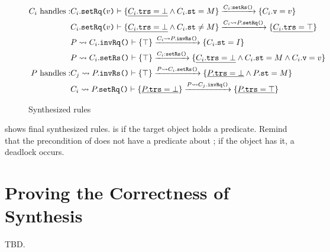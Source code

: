\documentclass[format=manuscript]{acmart}
\begin{document}
\begin{figure}[h]
  \begin{eqnarray*}
    C_i\ \textrm{handles}: &
    C_i.\texttt{setRq(}v\texttt{)}\vdash \{ \underline{C_i.\texttt{trs} = \bot{}} \wedge C_i.\texttt{st} = M \} \xrightarrow{C_i:\texttt{setRs()}} \{ C_i.\texttt{v} = v \} \\
    & C_i.\texttt{setRq(}v\texttt{)}\vdash \{ \underline{C_i.\texttt{trs} = \bot{}} \wedge C_i.\texttt{st} \neq M \} \xrightarrow{C_i \leadsto P.\texttt{setRq()}} \{ \underline{C_i.\texttt{trs} = \top{}} \} \\
    & P \leadsto C_i.\texttt{invRq()}\vdash \{ \top \} \xrightarrow{C_i \leadsto P.\texttt{invRs()}} \{ C_i.\texttt{st} = I \} \\
    & P \leadsto C_i.\texttt{setRs()}\vdash \{ \top \} \xrightarrow{C_i:\texttt{setRs()}} \{ \underline{C_i.\texttt{trs} = \bot{}} \wedge C_i.\texttt{st} = M \wedge C_i.\texttt{v} = v \} \\
    P\ \textrm{handles}: &
    C_j \leadsto P.\texttt{invRs()}\vdash \{ \top \} \xrightarrow{P \leadsto C_i.\texttt{setRs()}} \{ \underline{P.\texttt{trs} = \bot{}} \wedge P.\texttt{st} = M \} \\
    & C_i \leadsto P.\texttt{setRq()}\vdash \{ \underline{P.\texttt{trs} = \bot{}} \} \xrightarrow{P \leadsto C_j.\texttt{invRq()}} \{ \underline{P.\texttt{trs} = \top{}} \} \\
  \end{eqnarray*}
  \caption{Synthesized rules}
  \label{fig:synthesized-rules}
\end{figure}

 shows final synthesized rules. \trsOf{\cdot} is
\trsYes{} if the target object holds a predicate. Remind that the precondition
of  does not have a predicate about ; if the object
has it, a deadlock occurs.

\section{Proving the Correctness of Synthesis}

TBD.
\end{document}
